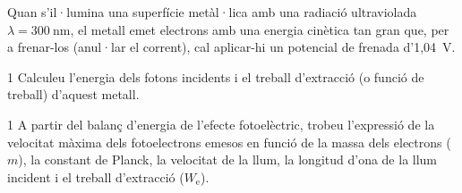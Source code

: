 Quan s'il·lumina una superfície metàl·lica amb una radiació ultraviolada $\lambda = 300\ \mathrm{nm}$, el metall emet electrons amb una energia cinètica tan gran que, per a frenar-los (anul·lar el corrent), cal aplicar-hi un potencial de frenada d'1,04~V.

\begin{apartat}{1}
Calculeu l'energia dels fotons incidents i el treball d'extracció (o funció de treball) d'aquest metall.
\end{apartat}

\begin{apartat}{1}
A partir del balanç d'energia de l'efecte fotoelèctric, trobeu l'expressió de la velocitat màxima dels fotoelectrons emesos en funció de la massa dels electrons ($m$), la constant de Planck, la velocitat de la llum, la longitud d'ona de la llum incident i el treball d'extracció ($W_\mathrm{e}$).
\end{apartat}

